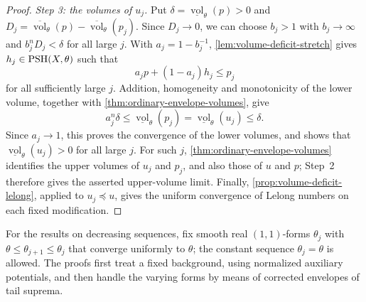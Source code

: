 \begin{proof}
\emph{Step 3: the volumes of $u_j$.} Put $\delta=\underline{\operatorname{vol}}_\theta(p)>0$ and $D_j=\overline{\operatorname{vol}}_\theta(p)-\overline{\operatorname{vol}}_\theta(p_j)$. Since $D_j\to0$, we can choose $b_j>1$ with $b_j\to\infty$ and $b_j^nD_j<\delta$ for all large $j$. With $a_j=1-b_j^{-1}$, \cref{lem:volume-deficit-stretch} gives $h_j\in\mathrm{PSH}(X,\theta)$ such that
\[
 a_jp+(1-a_j)h_j\leq p_j
\]
for all sufficiently large $j$. Addition, homogeneity and monotonicity of the lower volume, together with \cref{thm:ordinary-envelope-volumes}, give
\[
 a_j^n\delta\leq\underline{\operatorname{vol}}_\theta(p_j)
       =\underline{\operatorname{vol}}_\theta(u_j)\leq\delta.
\]
Since $a_j\to1$, this proves the convergence of the lower volumes, and shows that $\underline{\operatorname{vol}}_\theta(u_j)>0$ for all large $j$. For such $j$, \cref{thm:ordinary-envelope-volumes} identifies the upper volumes of $u_j$ and $p_j$, and also those of $u$ and $p$; Step~2 therefore gives the asserted upper-volume limit. Finally, \cref{prop:volume-deficit-lelong}, applied to $u_j\preceq u$, gives the uniform convergence of Lelong numbers on each fixed modification.
\end{proof}

For the results on decreasing sequences, fix smooth real $(1,1)$-forms $\theta_j$ with $\theta\leq\theta_{j+1}\leq\theta_j$ that converge uniformly to $\theta$; the constant sequence $\theta_j=\theta$ is allowed. The proofs first treat a fixed background, using normalized auxiliary potentials, and then handle the varying forms by means of corrected envelopes of tail suprema.

